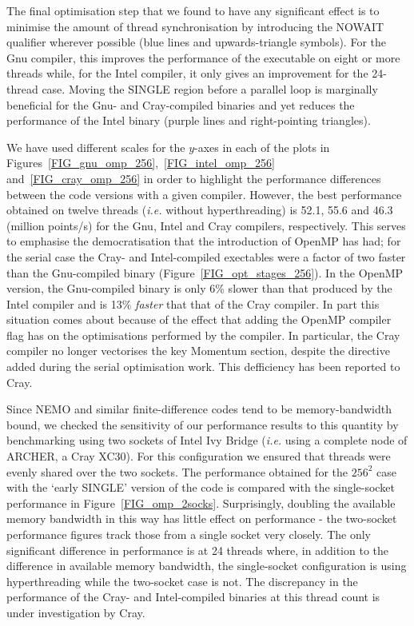 \documentclass[journal]{IEEEtran}
\begin{document}
The final optimisation step that we found to have any significant
effect is to minimise the amount of thread synchronisation by
introducing the NOWAIT qualifier wherever possible (blue lines and
upwards-triangle symbols). For the Gnu compiler, this improves the
performance of the executable on eight or more threads while, for the
Intel compiler, it only gives an improvement for the 24-thread
case. Moving the SINGLE region before a parallel loop is marginally
beneficial for the Gnu- and Cray-compiled binaries and yet reduces the
performance of the Intel binary (purple lines and right-pointing
triangles).

We have used different scales for the $y$-axes in each of the plots in
Figures~\ref{FIG_gnu_omp_256},~\ref{FIG_intel_omp_256}
and~\ref{FIG_cray_omp_256} in order to highlight the performance
differences between the code versions with a given compiler. However,
the best performance obtained on twelve threads ({\it i.e.}  without
hyperthreading) is 52.1, 55.6 and 46.3 (million points/s) for the Gnu,
Intel and Cray compilers, respectively. This serves to emphasise the
democratisation that the introduction of OpenMP has had; for the
serial case the Cray- and Intel-compiled exectables were a factor of
two faster than the Gnu-compiled binary
(Figure~\ref{FIG_opt_stages_256}). In the OpenMP version, the
Gnu-compiled binary is only 6\% slower than that produced by the Intel
compiler and is 13\% {\em faster} that that of the Cray compiler. In
part this situation comes about because of the effect that adding the
OpenMP compiler flag has on the optimisations performed by the
compiler.  In particular, the Cray compiler no longer vectorises the
key Momentum section, despite the directive added during the serial
optimisation work. This defficiency has been reported to Cray.

Since NEMO and similar finite-difference codes tend to be
memory-bandwidth bound, we checked the sensitivity of our performance
results to this quantity by benchmarking using two sockets of Intel
Ivy Bridge ({\it i.e.} using a complete node of ARCHER, a Cray
XC30). For this configuration we ensured that threads were evenly
shared over the two sockets. The performance obtained for the $256^2$
case with the `early SINGLE' version of the code is compared with the
single-socket performance in
Figure~\ref{FIG_omp_2socks}. Surprisingly, doubling the available
memory bandwidth in this way has little effect on performance - the
two-socket performance figures track those from a single socket very
closely. The only significant difference in performance is at 24
threads where, in addition to the difference in available memory
bandwidth, the single-socket configuration is using hyperthreading
while the two-socket case is not.  The discrepancy in the performance
of the Cray- and Intel-compiled binaries at this thread count is under
investigation by Cray.
\end{document}
